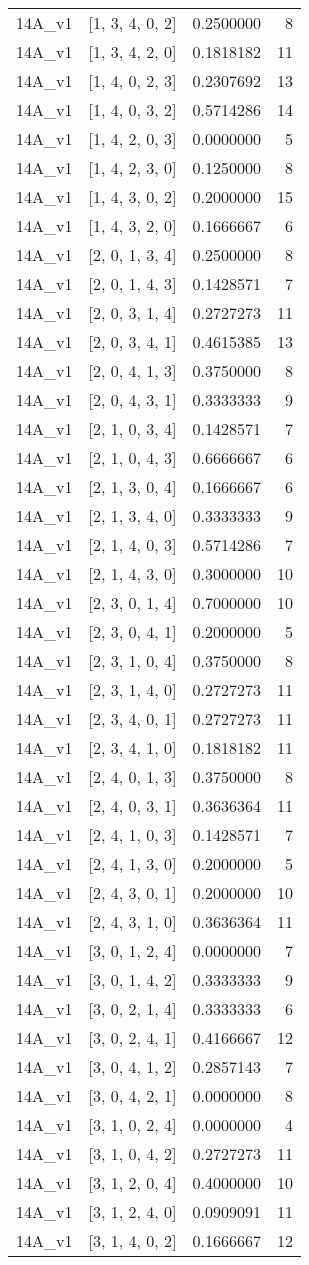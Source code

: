 \documentclass[]{book}
\theoremstyle{definition}
\theoremstyle{definition}
\theoremstyle{definition}
\theoremstyle{remark}
\begin{document}
\begin{longtable}[]{@{}llrr@{}}
14A\_v1 & {[}1, 3, 4, 0, 2{]} & 0.2500000 & 8\tabularnewline
14A\_v1 & {[}1, 3, 4, 2, 0{]} & 0.1818182 & 11\tabularnewline
14A\_v1 & {[}1, 4, 0, 2, 3{]} & 0.2307692 & 13\tabularnewline
14A\_v1 & {[}1, 4, 0, 3, 2{]} & 0.5714286 & 14\tabularnewline
14A\_v1 & {[}1, 4, 2, 0, 3{]} & 0.0000000 & 5\tabularnewline
14A\_v1 & {[}1, 4, 2, 3, 0{]} & 0.1250000 & 8\tabularnewline
14A\_v1 & {[}1, 4, 3, 0, 2{]} & 0.2000000 & 15\tabularnewline
14A\_v1 & {[}1, 4, 3, 2, 0{]} & 0.1666667 & 6\tabularnewline
14A\_v1 & {[}2, 0, 1, 3, 4{]} & 0.2500000 & 8\tabularnewline
14A\_v1 & {[}2, 0, 1, 4, 3{]} & 0.1428571 & 7\tabularnewline
14A\_v1 & {[}2, 0, 3, 1, 4{]} & 0.2727273 & 11\tabularnewline
14A\_v1 & {[}2, 0, 3, 4, 1{]} & 0.4615385 & 13\tabularnewline
14A\_v1 & {[}2, 0, 4, 1, 3{]} & 0.3750000 & 8\tabularnewline
14A\_v1 & {[}2, 0, 4, 3, 1{]} & 0.3333333 & 9\tabularnewline
14A\_v1 & {[}2, 1, 0, 3, 4{]} & 0.1428571 & 7\tabularnewline
14A\_v1 & {[}2, 1, 0, 4, 3{]} & 0.6666667 & 6\tabularnewline
14A\_v1 & {[}2, 1, 3, 0, 4{]} & 0.1666667 & 6\tabularnewline
14A\_v1 & {[}2, 1, 3, 4, 0{]} & 0.3333333 & 9\tabularnewline
14A\_v1 & {[}2, 1, 4, 0, 3{]} & 0.5714286 & 7\tabularnewline
14A\_v1 & {[}2, 1, 4, 3, 0{]} & 0.3000000 & 10\tabularnewline
14A\_v1 & {[}2, 3, 0, 1, 4{]} & 0.7000000 & 10\tabularnewline
14A\_v1 & {[}2, 3, 0, 4, 1{]} & 0.2000000 & 5\tabularnewline
14A\_v1 & {[}2, 3, 1, 0, 4{]} & 0.3750000 & 8\tabularnewline
14A\_v1 & {[}2, 3, 1, 4, 0{]} & 0.2727273 & 11\tabularnewline
14A\_v1 & {[}2, 3, 4, 0, 1{]} & 0.2727273 & 11\tabularnewline
14A\_v1 & {[}2, 3, 4, 1, 0{]} & 0.1818182 & 11\tabularnewline
14A\_v1 & {[}2, 4, 0, 1, 3{]} & 0.3750000 & 8\tabularnewline
14A\_v1 & {[}2, 4, 0, 3, 1{]} & 0.3636364 & 11\tabularnewline
14A\_v1 & {[}2, 4, 1, 0, 3{]} & 0.1428571 & 7\tabularnewline
14A\_v1 & {[}2, 4, 1, 3, 0{]} & 0.2000000 & 5\tabularnewline
14A\_v1 & {[}2, 4, 3, 0, 1{]} & 0.2000000 & 10\tabularnewline
14A\_v1 & {[}2, 4, 3, 1, 0{]} & 0.3636364 & 11\tabularnewline
14A\_v1 & {[}3, 0, 1, 2, 4{]} & 0.0000000 & 7\tabularnewline
14A\_v1 & {[}3, 0, 1, 4, 2{]} & 0.3333333 & 9\tabularnewline
14A\_v1 & {[}3, 0, 2, 1, 4{]} & 0.3333333 & 6\tabularnewline
14A\_v1 & {[}3, 0, 2, 4, 1{]} & 0.4166667 & 12\tabularnewline
14A\_v1 & {[}3, 0, 4, 1, 2{]} & 0.2857143 & 7\tabularnewline
14A\_v1 & {[}3, 0, 4, 2, 1{]} & 0.0000000 & 8\tabularnewline
14A\_v1 & {[}3, 1, 0, 2, 4{]} & 0.0000000 & 4\tabularnewline
14A\_v1 & {[}3, 1, 0, 4, 2{]} & 0.2727273 & 11\tabularnewline
14A\_v1 & {[}3, 1, 2, 0, 4{]} & 0.4000000 & 10\tabularnewline
14A\_v1 & {[}3, 1, 2, 4, 0{]} & 0.0909091 & 11\tabularnewline
14A\_v1 & {[}3, 1, 4, 0, 2{]} & 0.1666667 & 12\tabularnewline

\end{longtable}
\end{document}
